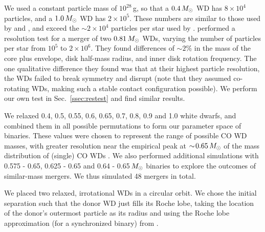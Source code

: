 We used a constant particle mass of $10^{28}\,$g, so that a $0.4\,\Msun$ WD has $8\times10^4$ particles, and a $1.0\,\Msun$ WD has $2\times10^5$.  These numbers are similar to those used by  and \cite{yoonpr07}, and exceed the $\sim2\times10^4$ particles per star used by \cite{dan+12}. \cite{rask+12} performed a resolution test for a merger of two $0.81\,\Msun$ WDs, varying the number of particles per star from $10^5$ to $2\times10^6$.  They found differences of $\sim\!2\%$ in the mass of the core plus envelope, disk half-mass radius, and inner disk rotation frequency.  The one qualitative difference they found was that at their highest particle resolution, the WDs failed to break symmetry and disrupt (note that they assumed co-rotating WDs, making such a stable contact configuration possible).  We perform our own test in Sec.~\ref{ssec:restest} and find similar results.

We relaxed 0.4, 0.5, 0.55, 0.6, 0.65, 0.7, 0.8, 0.9 and 1.0 {\Msun} white dwarfs, and combined them in all possible permutations to form our parameter space of binaries.  These values were chosen to represent the range of possible CO WD masses, with greater resolution near the empirical peak at $\sim\!0.65\,\Msun$ of the mass distribution of (single) CO WDs \citep{tremb09}.  We also performed additional simulations with 0.575 - 0.65, 0.625 - 0.65 and 0.64 - 0.65$\,\Msun$ binaries to explore the outcomes of similar-mass mergers.  We thus simulated 48 mergers in total.

We placed two relaxed, irrotational WDs in a circular orbit.  We chose the initial separation {\azero} such that the donor WD just fills its Roche lobe, taking the location of the donor's outermost particle as its radius and using the Roche lobe approximation (for a synchronized binary) from \citet{eggl83}.  


